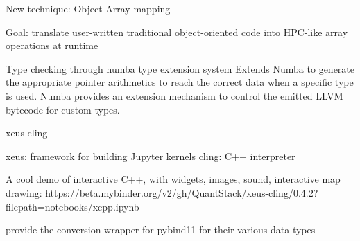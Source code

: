  New technique: Object Array mapping

Goal: translate user-written traditional object-oriented code into HPC-like array operations at runtime

Type checking through numba type extension system
Extends Numba to generate the appropriate pointer arithmetics to reach the correct data when a specific type  is used. Numba provides an extension mechanism to control the emitted LLVM bytecode for custom types.

 xeus-cling

xeus: framework for building Jupyter kernels
cling: C++ interpreter

A cool demo of interactive C++, with widgets, images, sound, interactive map drawing:
https://beta.mybinder.org/v2/gh/QuantStack/xeus-cling/0.4.2?filepath=notebooks/xcpp.ipynb

provide the conversion wrapper for pybind11 for their various data types

